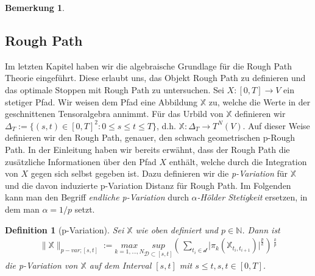 \documentclass[12pt,titlepage,headsepline]{article}
\newtheorem{definition}{Definition}[section]
\newtheorem*{bemerkung*}{Bemerkung}
\begin{document}
\begin{bemerkung*}
{        %
        }
      \end{bemerkung*}
      \newpage

      \subsection{Rough Path}
      Im letzten Kapitel haben wir die algebraische Grundlage für die Rough Path Theorie eingeführt. Diese erlaubt uns, das Objekt Rough Path zu definieren und das optimale Stoppen mit Rough Path zu untersuchen.
      \hfill\break
      Sei $X: [0,T] \rightarrow V$ ein stetiger Pfad. Wir weisen dem Pfad eine Abbildung $\mathbb{X}$ zu, welche die Werte in der geschnittenen Tensoralgebra annimmt. Für das Urbild von $\mathbb{X}$ definieren wir $\Delta_T := \{ (s,t) \in [0,T]^2  : 0 \leq s \leq t \leq T\}$, d.h. $\mathbb{X}: \Delta_T \rightarrow T^N(V)$. Auf dieser Weise definieren wir den Rough Path, genauer, den schwach geometrischen p-Rough Path. In der Einleitung haben wir bereits erwähnt, dass der Rough Path die zusätzliche Informationen über den Pfad $X$ enthält, welche durch die Integration von $X$ gegen sich selbst gegeben ist. Dazu definieren wir die \textit{p-Variation} für $\mathbb{X}$ und die davon induzierte p-Variation Distanz für Rough Path. Im Folgenden kann man den Begriff \textit{endliche p-Variation} durch \textit{$\alpha$-Hölder Stetigkeit} ersetzen, in dem man $\alpha=1/p$ setzt.
      \begin{definition}[p-Variation]
        Sei $\mathbb{X}$ wie oben definiert und $p \in \mathbb{N}$. Dann ist
        \begin{align*}
          \lVert \mathbb{X} \rVert_{p-var;[s,t]} := \underset{k=1,\ldots,N}{max} \underset{\mathcal{D} \subset [s,t]}{sup} (\,\sum_{t_i \in \mathcal{d}} \lvert \pi_k(\mathbb{X}_{t_i,t_{i+1}}) \rvert^{\frac{p}{k}})\,^{\frac{k}{p}}
        \end{align*}
        die p-Variation von $\mathbb{X}$ auf dem Interval $[s,t]$ mit $s \leq t, s,t \in [0,T]$.
      \end{definition}
\end{document}
